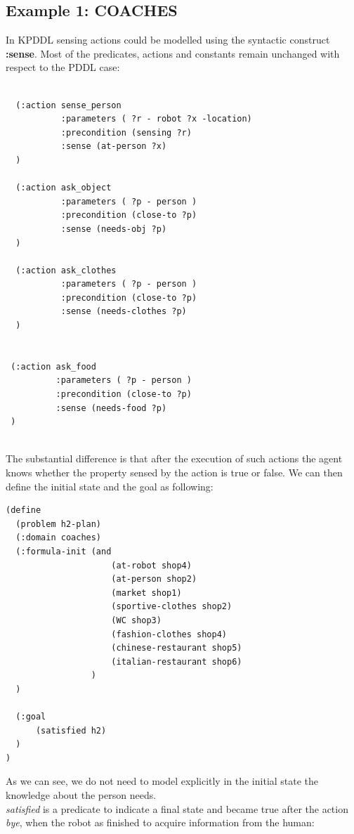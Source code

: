\documentclass[pdftex,12pt,a4paper]{report}
\begin{document}
\subsection{Example 1: COACHES}
In KPDDL sensing actions could be modelled using the syntactic construct \textbf{:sense}. Most of the predicates, actions and constants remain unchanged with respect to the PDDL case:
\begin{verbatim}

  (:action sense_person
           :parameters ( ?r - robot ?x -location)
           :precondition (sensing ?r)
           :sense (at-person ?x)
  )

  (:action ask_object
           :parameters ( ?p - person )
           :precondition (close-to ?p)
           :sense (needs-obj ?p)
  )

  (:action ask_clothes
           :parameters ( ?p - person )
           :precondition (close-to ?p)
           :sense (needs-clothes ?p)
  )


 (:action ask_food
          :parameters ( ?p - person )
          :precondition (close-to ?p)
          :sense (needs-food ?p)
 )
\end{verbatim}\\
\noindent The substantial difference is that after the execution of such actions the agent knows whether the property sensed by the action is true or false. 
\noindent We can then define the initial state and the goal as following:
\begin{verbatim}
(define
  (problem h2-plan)
  (:domain coaches)
  (:formula-init (and
                     (at-robot shop4)
                     (at-person shop2)
                     (market shop1)
                     (sportive-clothes shop2)
                     (WC shop3)
                     (fashion-clothes shop4)
                     (chinese-restaurant shop5)
                     (italian-restaurant shop6)
                 )
  )

  (:goal
      (satisfied h2)
  )
)
\end{verbatim}
\noindent As we can see, we do not need to model explicitly in the initial state the knowledge about the person needs.\\
\textit{satisfied} is a predicate to indicate a final state and became true after the action \textit{bye}, when the robot as finished to acquire information from the human:
\end{document}
